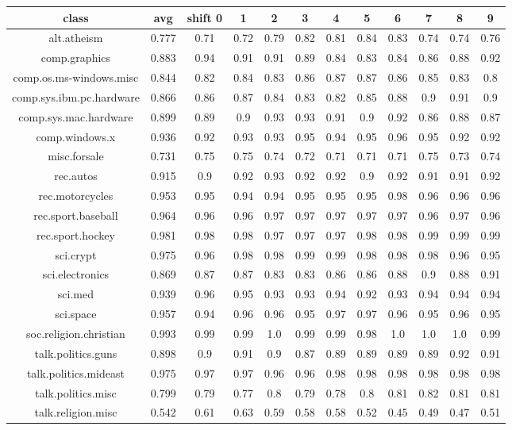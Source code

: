 \documentclass{article}
\begin{document}
\begin{table}[!ht]
	\centering
	\begin{tabular}{ |c|c|c|c|c|c|c|c|c|c|c|c| }
		\hline
		\textbf{class} & \textbf{avg} & shift 0 & 1& 2& 3& 4& 5& 6& 7& 8& 9 \\
		\hline

alt.atheism & 0.777  & 0.71 & 0.72 & 0.79 & 0.82 & 0.81 & 0.84 & 0.83 & 0.74 & 0.74 & 0.76 \\
\hline
comp.graphics & 0.883  & 0.94 & 0.91 & 0.91 & 0.89 & 0.84 & 0.83 & 0.84 & 0.86 & 0.88 & 0.92 \\
\hline
comp.os.ms-windows.misc & 0.844  & 0.82 & 0.84 & 0.83 & 0.86 & 0.87 & 0.87 & 0.86 & 0.85 & 0.83 & 0.8 \\
\hline
comp.sys.ibm.pc.hardware & 0.866  & 0.86 & 0.87 & 0.84 & 0.83 & 0.82 & 0.85 & 0.88 & 0.9 & 0.91 & 0.9 \\
\hline
comp.sys.mac.hardware & 0.899  & 0.89 & 0.9 & 0.93 & 0.93 & 0.91 & 0.9 & 0.92 & 0.86 & 0.88 & 0.87 \\
\hline
comp.windows.x & 0.936  & 0.92 & 0.93 & 0.93 & 0.95 & 0.94 & 0.95 & 0.96 & 0.95 & 0.92 & 0.92 \\
\hline
misc.forsale & 0.731  & 0.75 & 0.75 & 0.74 & 0.72 & 0.71 & 0.71 & 0.71 & 0.75 & 0.73 & 0.74 \\
\hline
rec.autos & 0.915  & 0.9 & 0.92 & 0.93 & 0.92 & 0.92 & 0.9 & 0.92 & 0.91 & 0.91 & 0.92 \\
\hline
rec.motorcycles & 0.953  & 0.95 & 0.94 & 0.94 & 0.95 & 0.95 & 0.95 & 0.98 & 0.96 & 0.96 & 0.96 \\
\hline
rec.sport.baseball & 0.964  & 0.96 & 0.96 & 0.97 & 0.97 & 0.97 & 0.97 & 0.97 & 0.96 & 0.97 & 0.96 \\
\hline
rec.sport.hockey & 0.981  & 0.98 & 0.98 & 0.97 & 0.97 & 0.97 & 0.98 & 0.98 & 0.99 & 0.99 & 0.99 \\
\hline
sci.crypt & 0.975  & 0.96 & 0.98 & 0.98 & 0.99 & 0.99 & 0.98 & 0.98 & 0.98 & 0.96 & 0.95 \\
\hline
sci.electronics & 0.869  & 0.87 & 0.87 & 0.83 & 0.83 & 0.86 & 0.86 & 0.88 & 0.9 & 0.88 & 0.91 \\
\hline
sci.med & 0.939  & 0.96 & 0.95 & 0.93 & 0.93 & 0.94 & 0.92 & 0.93 & 0.94 & 0.94 & 0.94 \\
\hline
sci.space & 0.957  & 0.94 & 0.96 & 0.96 & 0.95 & 0.97 & 0.97 & 0.96 & 0.95 & 0.96 & 0.95 \\
\hline
soc.religion.christian & 0.993  & 0.99 & 0.99 & 1.0 & 0.99 & 0.99 & 0.98 & 1.0 & 1.0 & 1.0 & 0.99 \\
\hline
talk.politics.guns & 0.898  & 0.9 & 0.91 & 0.9 & 0.87 & 0.89 & 0.89 & 0.89 & 0.89 & 0.92 & 0.91 \\
\hline
talk.politics.mideast & 0.975  & 0.97 & 0.97 & 0.96 & 0.96 & 0.98 & 0.98 & 0.98 & 0.98 & 0.98 & 0.98 \\
\hline
talk.politics.misc & 0.799  & 0.79 & 0.77 & 0.8 & 0.79 & 0.78 & 0.8 & 0.81 & 0.82 & 0.81 & 0.81 \\
\hline
talk.religion.misc & 0.542  & 0.61 & 0.63 & 0.59 & 0.58 & 0.58 & 0.52 & 0.45 & 0.49 & 0.47 & 0.51 \\
\hline


\end{tabular}
\end{table}
\end{document}
